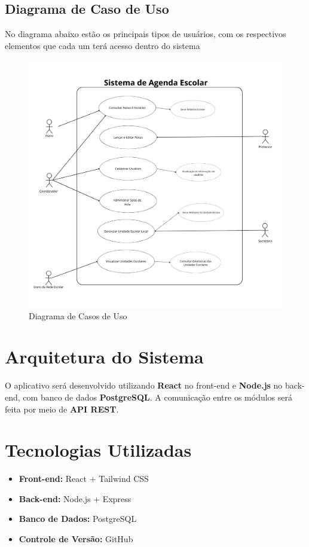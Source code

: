 \documentclass[12pt,a4paper]{report}
\begin{document}
\section{Diagrama de Caso de Uso}
\label{sec:DCU}
No diagrama abaixo estão os principais tipos de usuários, com os respectivos elementos que cada um terá acesso dentro do sistema
\begin{figure}[h!]
\centering
\includegraphics[width=.9\textwidth]{imagens/aluno.png}
\caption{Diagrama de Casos de Uso}
\label{Diagrama de Casos de Uso}
\end{figure}



\chapter{Arquitetura do Sistema}
O aplicativo será desenvolvido utilizando \textbf{React} no front-end e \textbf{Node.js} no back-end, com banco de dados \textbf{PostgreSQL}.  
A comunicação entre os módulos será feita por meio de \textbf{API REST}.

\chapter{Tecnologias Utilizadas}
\begin{itemize}
    \item \textbf{Front-end:} React + Tailwind CSS
    \item \textbf{Back-end:} Node.js + Express
    \item \textbf{Banco de Dados:} PostgreSQL
    \item \textbf{Controle de Versão:} GitHub
\end{itemize}
\end{document}
